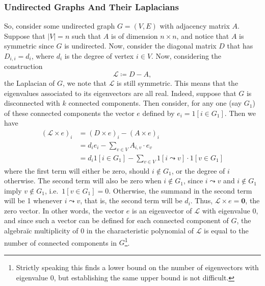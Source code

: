 \subsubsection{Undirected Graphs And Their Laplacians}
So, consider some undirected graph $G = (V, E)$ with adjacency matrix $A$. Suppose that $|V| = n$
such that $A$ is of dimension $n \times n$, and notice that $A$ is symmetric since $G$ is 
undirected. Now, consider the diagonal matrix $D$ that has $D_{i,i} = d_i$, where $d_i$ is the 
degree of vertex $i \in V$. Now, considering the construction 
$$
	\mathcal{L} \coloneqq D - A,
$$
the Laplacian of $G$, we note that $\mathcal{L}$ is still symmetric. This means that the 
eigenvalues associated to its eigenvectors are all real. Indeed, suppose that $G$ is disconnected
with $k$ connected components. Then consider, for any one (say $G_1$) of these connected components
the vector $e$ defined by $e_i = 1[i \in G_1]$. Then we have 
\begin{align*}
	(\mathcal{L} \times e)_i &= (D \times e)_i -(A \times e)_i \\
	&= d_i e_i - \sum_{v \in V} A_{i,v} \cdot e_v \\
	&= d_i 1[i \in G_1] - \sum_{v\in V} 1[i \leadsto v] \cdot 1[v\in G_1]
\end{align*}
where the first term will either be zero, should $i\notin G_1$, or the degree of $i$ otherwise. 
The second term will also be zero when $i \notin G_1$, since $i\leadsto v$ and $i \notin G_1$ imply
$v \notin G_1$, i.e.\ $1[v \in G_1] = 0$. Otherwise, the summand in the second term will be 1 
whenever $i \leadsto v$, that is, the second term will be $d_i$. Thus, $\mathcal{L}\times e = 
\mathbf{0}$, the zero vector. In other words, the vector $e$ is an eigenvector of $\mathcal{L}$ 
with eigenvalue 0, and since such a vector can be defined for each connected component of $G$, the
algebra\"ic multiplicity of $0$ in the characteristic polynomial of $\mathcal{L}$ is equal to the 
number of connected components in $G$\footnote{Strictly speaking this finds a lower bound on the 
number of eigenvectors with eigenvalue 0, but establishing the same upper bound is not difficult.}.

